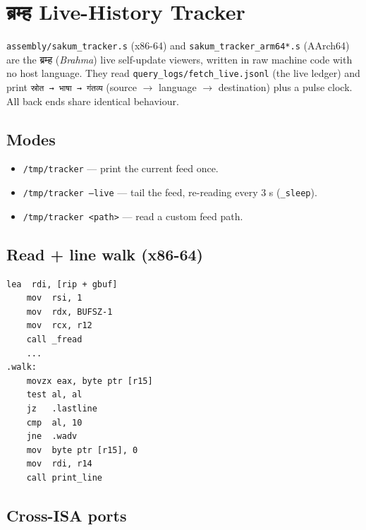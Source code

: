 \section{ब्रम्ह Live-History Tracker}\label{ch:tracker}

\texttt{assembly/sakum\_tracker.s} (x86-64) and
\texttt{sakum\_tracker\_arm64*.s} (AArch64) are the ब्रम्ह
(\emph{Brahma}) live self-update viewers, written in raw machine code with
no host language.  They read \texttt{query\_logs/fetch\_live.jsonl} (the
live ledger) and print \texttt{स्रोत → भाषा → गंतव्य} (source $\to$
language $\to$ destination) plus a pulse clock.  All back ends share
identical behaviour.

\subsection{Modes}

\begin{itemize}
  \item \texttt{/tmp/tracker} --- print the current feed once.
  \item \texttt{/tmp/tracker --live} --- tail the feed, re-reading every 3 s
    (\texttt{\_sleep}).
  \item \texttt{/tmp/tracker <path>} --- read a custom feed path.
\end{itemize}

\subsection{Read + line walk (x86-64)}

\begin{lstlisting}[language=SakumAsm,caption={Feed read + line split (sakum\_tracker.s:182).}]
    lea  rdi, [rip + gbuf]
    mov  rsi, 1
    mov  rdx, BUFSZ-1
    mov  rcx, r12
    call _fread
    ...
.walk:
    movzx eax, byte ptr [r15]
    test al, al
    jz   .lastline
    cmp  al, 10
    jne  .wadv
    mov  byte ptr [r15], 0
    mov  rdi, r14
    call print_line
\end{lstlisting}

\subsection{Cross-ISA ports}


